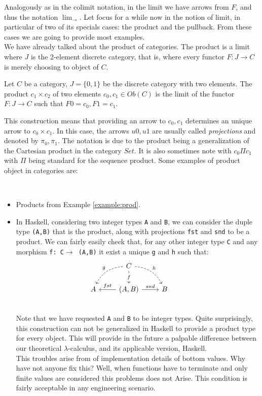Analogously as in the colimit notation, in the limit we have arrows from $F$, and thus the notation $\lim_{\rightarrow}$. Let focus for a while now in the notion of limit, in particular of two of its specials cases: the product and the pullback. From these cases we are going to provide most examples. \\

We have already talked about the product of categories. The product is a limit where $J$ is the 2-element discrete category, that is, where every functor $F:J\to C$ is merely choosing to object of $C$. 

\begin{definition}\label{prod-univ}
  Let $C$ be a category, $J=\{0,1\}$ be the discrete category with two elements. The product $c_1\times c_2$ of two elements $c_0,c_1\in Ob(C)$ is the limit of the functor $F:J\to C$ such that $F0 = c_0, F1= c_1$.
\end{definition}

This construction means that providing an arrow to $c_0,c_1$ determines an unique arrow to $c_0\times c_1$. In this case, the arrows $u0, u1$ are usually called \emph{projections} and denoted by $\pi_0, \pi_1$. The notation is due to the product being a generalization of the Cartesian product in the category $Set$. It is also sometimes note with $c_0 \Pi c_1$ with $\Pi$ being standard for the sequence product. Some examples of product object in categories are:
\begin{example}\ 
\begin{itemize}
\item Products from Example \ref{example:prod}.
\item In Haskell, considering two integer types \texttt{A} and \texttt{B}, we can consider the duple type \texttt{(A,B)} that is the product, along with projections \texttt{fst} and \texttt{snd} to be a product. We can fairly easily check that, for any other integer type \texttt{C} and any morphism \texttt{f: C$\to$ (A,B)} it exist a unique \texttt{g} and \texttt{h} such that:
\[
\begin{tikzcd}
{} & C \arrow[bend right,swap,dashed]{dl}{g}
\arrow[bend left,dashed]{dr}{h} \arrow{d}[description]{f}& & \\
A  &(A,B) \arrow{l}[swap]{fst} \arrow{r}{snd} & 
B \\
\end{tikzcd}
\]
Note that we have requested \texttt{A} and \texttt{B} to be integer types. Quite surprisingly, this construction can not be generalized in Haskell to provide a product type for every object\cite{wiki:hask}. This will provide in the future a palpable difference between our theoretical $\lambda$-calculus, and its applicable version,  Haskell.\\

This troubles arise from of implementation details of bottom values. Why have not anyone fix this? Well, when functions have to terminate and only finite values are considered this problems does not Arise. This condition is fairly acceptable in any engineering scenario. 
\end{itemize}
\end{example}

